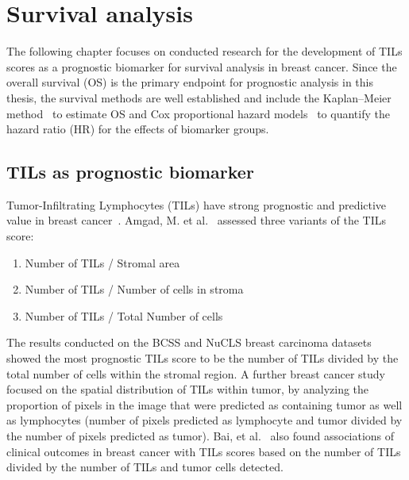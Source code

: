 \section{Survival analysis}
The following chapter focuses on conducted research for the development of TILs scores as a prognostic biomarker for survival analysis in breast cancer.
Since the overall survival (OS) is the primary endpoint for prognostic analysis in this thesis,
the survival methods are well established and include the Kaplan–Meier method~\cite{kaplan1958nonparametric} to estimate OS
and Cox proportional hazard models~\cite{https://doi.org/10.1111/j.2517-6161.1972.tb00899.x} to quantify the hazard ratio (HR) for the effects of biomarker
groups.
\subsection{TILs as prognostic biomarker}
Tumor-Infiltrating Lymphocytes (TILs) have strong prognostic and predictive value in breast cancer~\cite{kos2020pitfalls, amgad2022mutils}. Amgad, M. et al.~\cite{amgad2022mutils} assessed three variants of the TILs score:
\begin{enumerate}
    \itemsep0em 
    \item Number of TILs / Stromal area 
    \item Number of TILs / Number of cells in stroma
    \item Number of TILs / Total Number of cells 
\end{enumerate}
The results conducted on the BCSS and NuCLS breast carcinoma datasets~\cite{amgad2019structured, amgad2021nucls} showed the most prognostic TILs score to be the number of TILs divided by the total number of cells within the stromal region.
A further breast cancer study~\cite{le2020utilizing} focused on the spatial distribution of TILs within tumor, by analyzing the proportion of pixels in the image that were predicted as containing tumor as well as lymphocytes (number of pixels predicted as lymphocyte and tumor divided by the number of pixels predicted as tumor).
Bai, et al.~\cite{bai2021open} also found associations of clinical outcomes in breast cancer with TILs scores based on
the number of TILs divided by the number of TILs and tumor cells detected.

